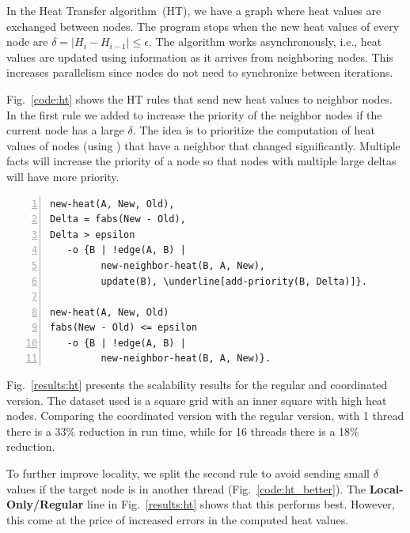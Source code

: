 In the Heat Transfer algorithm~(HT), we have a graph where heat values
are exchanged between nodes. The program stops when the new heat
values of every node are $\delta = |H_i - H_{i-1}| \le \epsilon$. The
algorithm works asynchronously, i.e., heat values are updated using
information as it arrives from neighboring nodes. This increases
parallelism since nodes do not need to synchronize between iterations.

Fig.~\ref{code:ht} shows the HT rules that send new heat values to
neighbor nodes. In the first rule we added  to increase the priority of the neighbor
nodes if the current node has a large $\delta$. The idea is to prioritize the
computation of heat values of nodes (using ) that have a neighbor
that changed significantly. Multiple  facts will
increase the priority of a node so that nodes with multiple large deltas will
have more priority.

\begin{topfig}
\scriptsize\begin{Verbatim}[numbers=left,commandchars=\\\[\]]
new-heat(A, New, Old),
Delta = fabs(New - Old),
Delta > epsilon
   -o {B | !edge(A, B) |
         new-neighbor-heat(B, A, New),
         update(B), \underline[add-priority(B, Delta)]}.

new-heat(A, New, Old)
fabs(New - Old) <= epsilon
   -o {B | !edge(A, B) |
         new-neighbor-heat(B, A, New)}.
\end{Verbatim}
\end{topfig}
\normalsize

Fig.~\ref{results:ht} presents the scalability results for the regular
and coordinated version. The dataset used is a square grid with an inner square
with high heat nodes. Comparing the coordinated version with the regular
version, with 1 thread there is a 33\% reduction in run time, while
for 16 threads there is a 18\% reduction.

To further improve locality, we split the second rule to avoid sending
small $\delta$ values if the target node is in another thread
(Fig.~\ref{code:ht_better}). The \textbf{Local-Only/Regular} line in
Fig.~\ref{results:ht} shows that this performs best.
However, this come at the price of increased errors in the computed
heat values.

